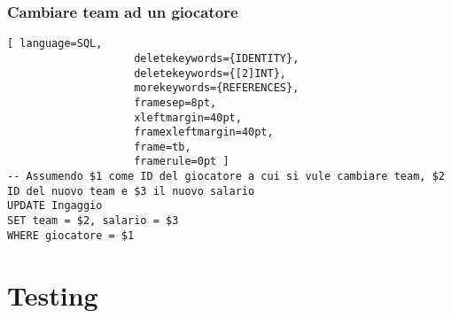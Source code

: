 \documentclass{article}
\begin{document}
\subsubsection{Cambiare team ad un giocatore}
\begin{lstlisting}[ language=SQL,
                    deletekeywords={IDENTITY},
                    deletekeywords={[2]INT},
                    morekeywords={REFERENCES},
                    framesep=8pt,
                    xleftmargin=40pt,
                    framexleftmargin=40pt,
                    frame=tb,
                    framerule=0pt ]
-- Assumendo $1 come ID del giocatore a cui si vule cambiare team, $2 ID del nuovo team e $3 il nuovo salario
UPDATE Ingaggio
SET team = $2, salario = $3
WHERE giocatore = $1
\end{lstlisting}

\section{Testing}
\end{document}
